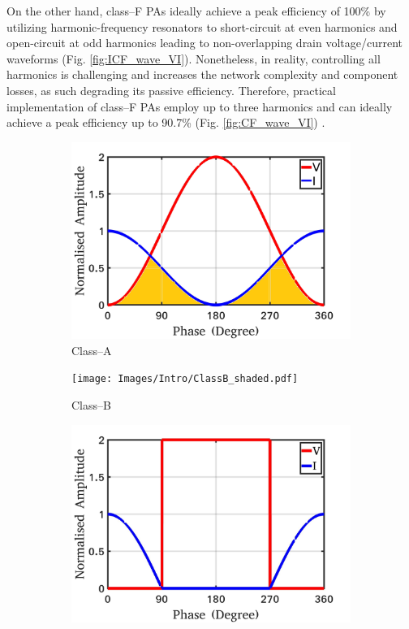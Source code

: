\documentclass[conference]{IEEEtran}
\begin{document}
On the other hand, class--F PAs ideally achieve a peak efficiency of 100\% by utilizing harmonic-frequency resonators to short-circuit at even harmonics and open-circuit at odd harmonics leading to non-overlapping drain voltage/current waveforms (Fig. \ref{fig:ICF_wave_VI}). Nonetheless, in reality, controlling all harmonics is challenging and increases the network complexity and component losses, as such degrading its passive efficiency. Therefore, practical implementation of class--F PAs employ up to three harmonics and can ideally achieve a peak efficiency up to 90.7\% (Fig. \ref{fig:CF_wave_VI}) \cite{Raab_max_eff}.
\begin{figure}[!t]
\centering
\captionsetup{font=footnotesize}
\begin{subfigure}{0.24\textwidth}
\includegraphics[width=1\textwidth]{Images/Intro/ClassA_shaded.pdf}
\caption{Class--A}
\label{fig:CA_wave_VI}
\end{subfigure}
\begin{subfigure}{0.24\textwidth}
\texttt{[image: Images/Intro/ClassB\_shaded.pdf]}
\caption{Class--B}
\label{fig:CB_wave_VI}
\end{subfigure}
\begin{subfigure}{0.24\textwidth}
\includegraphics[width=1\textwidth]{Images/Intro/ClassF.pdf}

\end{subfigure}
\end{figure}
\end{document}

